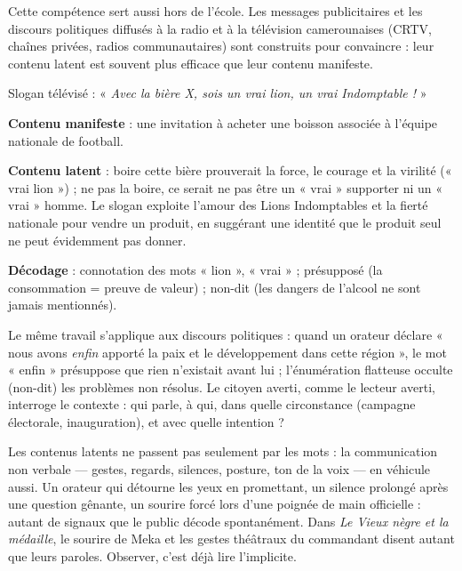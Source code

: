 \documentclass[11pt]{article}
\newcommand{\cle}[1]{{\popxbold\color{popdark}#1}}
\begin{document}
Cette compétence sert aussi hors de l'école. Les messages publicitaires et les discours politiques diffusés à la radio et à la télévision camerounaises (CRTV, chaînes privées, radios communautaires) sont construits pour convaincre : leur contenu latent est souvent plus efficace que leur contenu manifeste.

\begin{exemplebox}
Slogan télévisé : « \emph{Avec la bière X, sois un vrai lion, un vrai Indomptable !} »\par
\textbf{Contenu manifeste} : une invitation à acheter une boisson associée à l'équipe nationale de football.\par
\textbf{Contenu latent} : boire cette bière prouverait la force, le courage et la virilité (« vrai lion ») ; ne pas la boire, ce serait ne pas être un « vrai » supporter ni un « vrai » homme. Le slogan exploite l'amour des Lions Indomptables et la fierté nationale pour vendre un produit, en suggérant une identité que le produit seul ne peut évidemment pas donner.\par
\textbf{Décodage} : connotation des mots « lion », « vrai » ; présupposé (la consommation = preuve de valeur) ; non-dit (les dangers de l'alcool ne sont jamais mentionnés).
\end{exemplebox}

Le même travail s'applique aux discours politiques : quand un orateur déclare « nous avons \emph{enfin} apporté la paix et le développement dans cette région », le mot « enfin » présuppose que rien n'existait avant lui ; l'énumération flatteuse occulte (non-dit) les problèmes non résolus. Le citoyen averti, comme le lecteur averti, interroge le contexte : qui parle, à qui, dans quelle circonstance (campagne électorale, inauguration), et avec quelle intention ?

\begin{savaistu}
Les contenus latents ne passent pas seulement par les mots : la \cle{communication non verbale} — gestes, regards, silences, posture, ton de la voix — en véhicule aussi. Un orateur qui détourne les yeux en promettant, un silence prolongé après une question gênante, un sourire forcé lors d'une poignée de main officielle : autant de signaux que le public décode spontanément. Dans \emph{Le Vieux nègre et la médaille}, le sourire de Meka et les gestes théâtraux du commandant disent autant que leurs paroles. Observer, c'est déjà lire l'implicite.
\end{savaistu}
\end{document}
